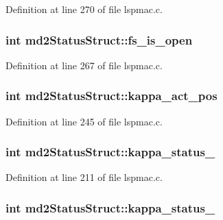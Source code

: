Definition at line 270 of file lspmac.c.\hypertarget{structmd2StatusStruct_aca3722c109e6646bd41fb269a32261f2}{
\subsubsection[{fs\_\-is\_\-open}]{\setlength{\rightskip}{0pt plus 5cm}int {\bf md2StatusStruct::fs\_\-is\_\-open}}}
\label{structmd2StatusStruct_aca3722c109e6646bd41fb269a32261f2}


Definition at line 267 of file lspmac.c.\hypertarget{structmd2StatusStruct_ac384fb7073387dd5dcb2e85a00ec8a77}{
\subsubsection[{kappa\_\-act\_\-pos}]{\setlength{\rightskip}{0pt plus 5cm}int {\bf md2StatusStruct::kappa\_\-act\_\-pos}}}
\label{structmd2StatusStruct_ac384fb7073387dd5dcb2e85a00ec8a77}


Definition at line 245 of file lspmac.c.\hypertarget{structmd2StatusStruct_ab152694bc32d37c1d180f55e8d282020}{
\subsubsection[{kappa\_\-status\_\-1}]{\setlength{\rightskip}{0pt plus 5cm}int {\bf md2StatusStruct::kappa\_\-status\_}}}
\label{structmd2StatusStruct_ab152694bc32d37c1d180f55e8d282020}


Definition at line 211 of file lspmac.c.\hypertarget{structmd2StatusStruct_af6891f5f8dcfc62668f64c583042c6bc}{
\subsubsection[{kappa\_\-status\_\-2}]{\setlength{\rightskip}{0pt plus 5cm}int {\bf md2StatusStruct::kappa\_\-status\_}}}
\label{structmd2StatusStruct_af6891f5f8dcfc62668f64c583042c6bc}


